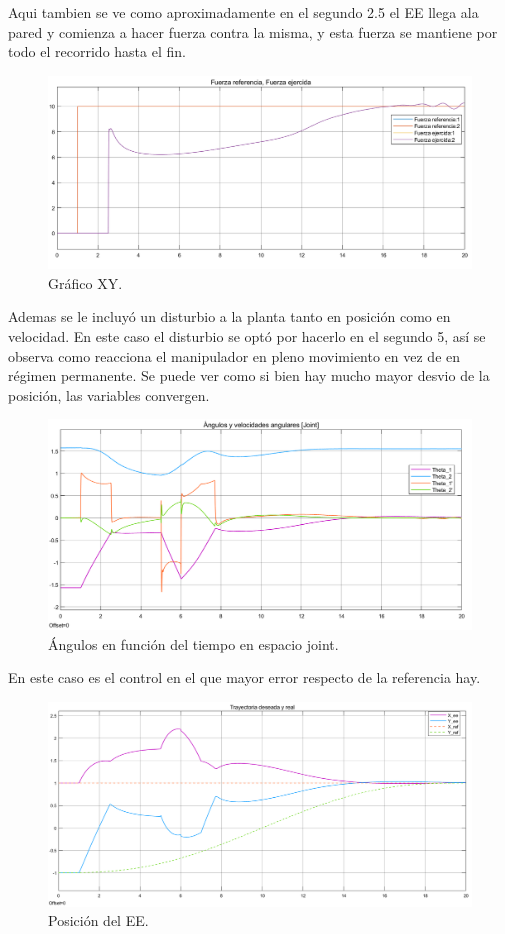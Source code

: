 Aqui tambien se ve como aproximadamente en el segundo 2.5 el EE llega  ala pared y comienza a hacer fuerza contra la misma, y esta fuerza se mantiene por todo el recorrido hasta el fin.
\begin{figure}[H]
	\centering
	\includegraphics[width=0.8\linewidth]{ImagenesControl híbrido no lineal/3_3_e}
	\caption{Gr\'afico XY.}	
	\label{fig:cf}
\end{figure}
Ademas se le incluy\'o un disturbio a la planta tanto en posici\'on como en velocidad. En este caso el disturbio se optó por hacerlo en el segundo 5, así se observa como reacciona el manipulador en pleno movimiento en vez de en régimen permanente.
Se puede ver como si bien hay mucho mayor desvio de la posición, las variables convergen. 
\begin{figure}[H]
	\centering
	\includegraphics[width=0.8\linewidth]{ImagenesControl híbrido no lineal/3_3_f_a}
	\caption{\'Angulos en funci\'on del tiempo en espacio joint.}	
	\label{fig:cthetasd}
\end{figure}
En este caso es el control en el que mayor error respecto de la referencia hay.
\begin{figure}[H]
	\centering
	\includegraphics[width=0.8\linewidth]{ImagenesControl híbrido no lineal/3_3_f_b}
	\caption{Posici\'on del EE.}	
	\label{fig:cposd}
\end{figure}
